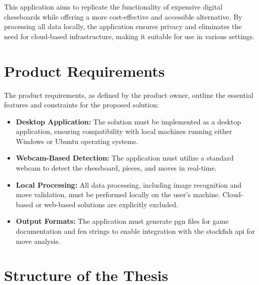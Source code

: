 This application aims to replicate the functionality of expensive digital chessboards while offering a more cost-effective and accessible alternative. By processing all data locally, the application ensures privacy and eliminates the need for cloud-based infrastructure, making it suitable for use in various settings.

\section{Product Requirements}

The product requirements, as defined by the product owner, outline the essential features and constraints for the proposed solution:

\begin{itemize}
    \item \textbf{Desktop Application:} The solution must be implemented as a desktop application, ensuring compatibility with local machines running either Windows or Ubuntu operating systems.

    \item \textbf{Webcam-Based Detection:} The application must utilize a standard webcam to detect the chessboard, pieces, and moves in real-time.

    \item \textbf{Local Processing:} All data processing, including image recognition and move validation, must be performed locally on the user's machine. Cloud-based or web-based solutions are explicitly excluded.

    \item \textbf{Output Formats:} The application must generate \gls{pgn} files for game documentation and \gls{fen} strings to enable integration with the \gls{stockfish} \gls{api} for move analysis.
\end{itemize}


\section{Structure of the Thesis}


